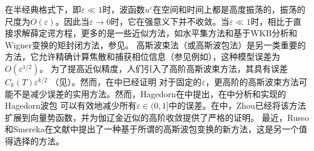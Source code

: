 
在半经典格式下，即$\varepsilon \ll 1$时，波函数$u^{\varepsilon}$在空间和时间上都是高度振荡的，振荡的尺度为$O(\varepsilon)$。因此当$\varepsilon\rightarrow0$时，它在强意义下并不收敛。当$\varepsilon\ll 1$时，相比于直接求解薛定谔方程，更多的是一些近似方法，如水平集方法和基于WKB分析和Wigner变换的矩封闭方法，参见。
高斯波束法（或高斯波包法）是另一类重要的方法，它允许精确计算焦散和捕获相位信息（参见例如），这种模型误差为$O(\varepsilon^{1/2})$。
为了提高近似精度，人们引入了高阶高斯波束方法，其具有误差$C_{k}(T)\varepsilon^{k/2}$
（见）。然而，在中已经证明
对于固定的$\varepsilon$，更高阶的高斯波束方法可能不是减少误差的实用方法。然而，Hagedorn在中提出，在中分析和实现的Hagedorn波包
可以有效地减少所有$\varepsilon\in(0,1]$中的误差。在中，Zhou已经将该方法扩展到向量势函数，并为伽辽金近似的高阶收敛提供了严格的证明。
最近，Russo和Smereka在文献中提出了一种基于所谓的高斯波包变换的新方法，这是另一个值得选择的方法。

